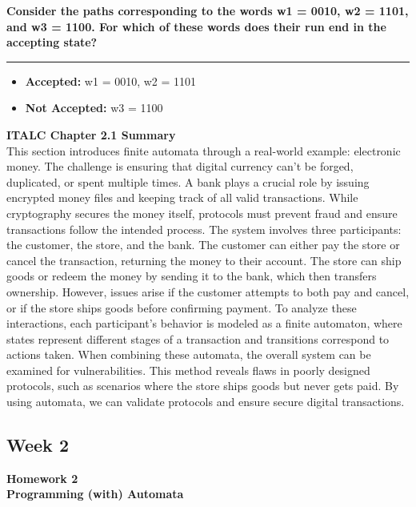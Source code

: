\documentclass{article}
\theoremstyle{theorem}
\theoremstyle{definition}
\theoremstyle{remark}
\begin{document}
\vspace{1em}

\textbf{Consider the paths corresponding to the words w1 = 0010, w2 = 1101, and w3 = 1100. For which of these words does their run end in the accepting state?}

\vspace{0.5em}
\hrule
\vspace{0.5em}

\begin{itemize}
    \item \textbf{Accepted:} w1 = 0010, w2 = 1101
    \item \textbf{Not Accepted:} w3 = 1100
\end{itemize}

\vspace{1em}

\textbf{ITALC Chapter 2.1 Summary} \\
This section introduces finite automata through a real-world example: electronic money. 
The challenge is ensuring that digital currency can’t be forged, duplicated, or spent multiple times. 
A bank plays a crucial role by issuing encrypted money files and keeping track of all valid transactions. 
While cryptography secures the money itself, protocols must prevent fraud and ensure transactions follow the intended process.
The system involves three participants: the customer, the store, and the bank. The customer can either pay the store or cancel the transaction, returning the money to their account. 
The store can ship goods or redeem the money by sending it to the bank, which then transfers ownership. 
However, issues arise if the customer attempts to both pay and cancel, or if the store ships goods before confirming payment.
To analyze these interactions, each participant's behavior is modeled as a finite automaton, where states represent different stages of a transaction and transitions correspond to actions taken. 
When combining these automata, the overall system can be examined for vulnerabilities. This method reveals flaws in poorly designed protocols, such as scenarios where the store ships goods but never gets paid. 
By using automata, we can validate protocols and ensure secure digital transactions.


\subsection{Week 2}
\textbf{Homework 2} \\
\textbf{Programming (with) Automata} \\
\end{document}
